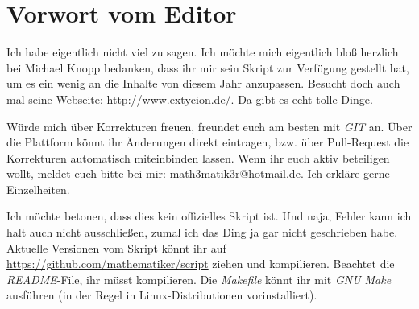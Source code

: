 \chapter{Vorwort vom Editor}

Ich habe eigentlich nicht viel zu sagen.  Ich möchte mich eigentlich bloß herzlich bei Michael Knopp bedanken, dass ihr mir sein Skript zur Verfügung gestellt hat, um es ein wenig an die Inhalte von diesem Jahr anzupassen. Besucht doch auch mal seine Webseite: \url{http://www.extycion.de/}.  Da gibt es echt tolle Dinge.  

Würde mich über Korrekturen freuen,  freundet euch am besten mit \emph{GIT} an. Über die Plattform könnt ihr Änderungen direkt eintragen,  bzw.  über Pull-Request die Korrekturen automatisch miteinbinden lassen.  Wenn ihr euch aktiv beteiligen wollt,  meldet euch bitte bei mir: \href{mailto: math3matik3r@hotmail.de}{math3matik3r@hotmail.de}. Ich erkläre gerne Einzelheiten. 

Ich möchte betonen, dass dies kein offizielles Skript ist.  Und naja,  Fehler kann ich halt auch nicht ausschließen, zumal ich das Ding ja gar nicht geschrieben habe. Aktuelle Versionen vom Skript könnt ihr auf \url{https://github.com/mathematiker/script} ziehen und kompilieren.  Beachtet die \emph{README}-File, ihr müsst  kompilieren.  Die \emph{Makefile}  könnt ihr mit \emph{GNU Make} ausführen (in der Regel in Linux-Distributionen vorinstalliert).  
